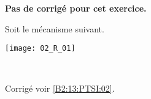 \normaltrue
\correctionfalse


\setcounter{question}{0}

\ifcorrection
\else
\textbf{Pas de corrigé pour cet exercice.}
\fi

\ifprof
\else
Soit le mécanisme suivant. 
\begin{center}
\texttt{[image: 02\_R\_01]}
\end{center}
\fi

\ifprof ~\\

\else
\fi


\ifprof
\else
\footnotesize

\normalsize

\begin{flushright}
\footnotesize{Corrigé  voir \ref{B2:13:PTSI:02}.}
\end{flushright}%
\fi